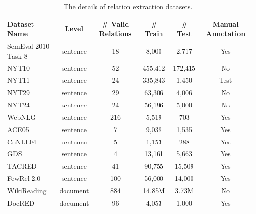 \begin{table}[ht]
\small
\centering
\begin{tabular}{lccccc}
\hline
Dataset Name & Level & \# Valid Relations & \# Train & \# Test & Manual Annotation \\ \hline
SemEval 2010 Task 8        & sentence         &  18           & 8,000         & 2,717        &  Yes                 \\ 
NYT10        & sentence         &  52           & 455,412         & 172,415        &  No                 \\ 
NYT11        & sentence         &  24           & 335,843         &  1,450       & Test                   \\ 
NYT29        & sentence         &  29           & 63,306         & 4,006        &  No                 \\ 
NYT24        & sentence         &  24           & 56,196         &  5,000       & No                   \\ 
WebNLG        & sentence         &  216           & 5,519         &  703       & Yes                   \\ 
ACE05        & sentence         &  7           &  9,038        &  1,535       & Yes                   \\ 
CoNLL04      & sentence         &  5           &  1,153        &  288       &   Yes                \\ 
GDS          & sentence         &  4           &  13,161        & 5,663        &   Yes                \\ 
TACRED   & sentence         &  41           &  90,755        &  15,509       &   Yes                \\ 
FewRel 2.0       &  sentence        &  100           &  56,000        &  14,000       &  Yes                 \\ 
WikiReading   & document         &  884           &  14.85M        &  3.73M       & No                   \\ 
DocRED   & document        &  96           &  4,053        & 1,000        &  Yes                 \\ \hline
\end{tabular}
\caption{The details of relation extraction datasets.}
\label{tab:re_datasets}
\end{table}
